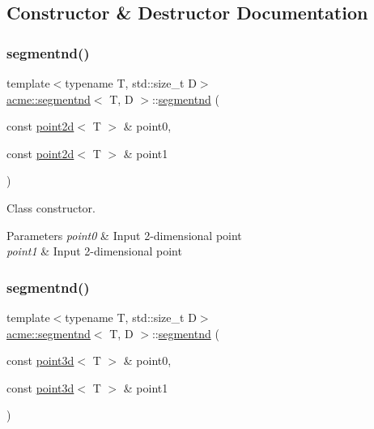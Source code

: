 \subsection{Constructor \& Destructor Documentation}
\mbox{\label{classacme_1_1segmentnd_ad0838ae4990ff412110d11524a416b3f}} 
\subsubsection{\texorpdfstring{segmentnd()}{segmentnd()}\hspace{0.1cm}{\footnotesize\ttfamily [1/4]}}
{\footnotesize\ttfamily template$<$typename T, std\+::size\+\_\+t D$>$ \\
\hyperlink{classacme_1_1segmentnd}{acme\+::segmentnd}$<$ T, D $>$\+::\hyperlink{classacme_1_1segmentnd}{segmentnd} (\begin{DoxyParamCaption}\item[{const \hyperlink{classacme_1_1point2d}{point2d}$<$ T $>$ \&}]{point0,  }\item[{const \hyperlink{classacme_1_1point2d}{point2d}$<$ T $>$ \&}]{point1 }\end{DoxyParamCaption})\hspace{0.3cm}{\ttfamily [inline]}}



Class constructor. 


\begin{DoxyParams}{Parameters}
{\em point0} & Input 2-\/dimensional point \\
\hline
{\em point1} & Input 2-\/dimensional point \\
\hline
\end{DoxyParams}
\mbox{\label{classacme_1_1segmentnd_a806b9abc096ae1dd9e94c88b3a8f0e97}} 
\subsubsection{\texorpdfstring{segmentnd()}{segmentnd()}\hspace{0.1cm}{\footnotesize\ttfamily [2/4]}}
{\footnotesize\ttfamily template$<$typename T, std\+::size\+\_\+t D$>$ \\
\hyperlink{classacme_1_1segmentnd}{acme\+::segmentnd}$<$ T, D $>$\+::\hyperlink{classacme_1_1segmentnd}{segmentnd} (\begin{DoxyParamCaption}\item[{const \hyperlink{classacme_1_1point3d}{point3d}$<$ T $>$ \&}]{point0,  }\item[{const \hyperlink{classacme_1_1point3d}{point3d}$<$ T $>$ \&}]{point1 }\end{DoxyParamCaption})\hspace{0.3cm}{\ttfamily [inline]}}



